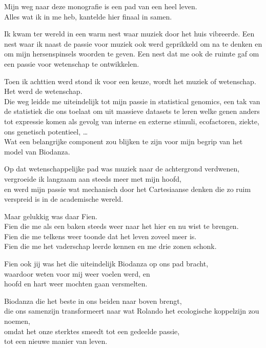\documentclass[
  11pt,
]{book}
\begin{document}
Mijn weg naar deze monografie is een pad van een heel leven.\\
Alles wat ik in me heb, kantelde hier finaal in samen.

Ik kwam ter wereld in een warm nest waar muziek door het huis vibreerde.
Een nest waar ik naast de passie voor muziek ook werd geprikkeld om na te denken en om mijn hersenspinsels woorden te geven.
Een nest dat me ook de ruimte gaf om een passie voor wetenschap te ontwikkelen.

Toen ik achttien werd stond ik voor een keuze, wordt het muziek of wetenschap.\\
Het werd de wetenschap.\\
Die weg leidde me uiteindelijk tot mijn passie in statistical genomics, een tak van de statistiek die ons toelaat om uit massieve datasets te leren welke genen anders tot expressie komen als gevolg van interne en externe stimuli, ecofactoren, ziekte, ons genetisch potentieel, \ldots{}\\
Wat een belangrijke component zou blijken te zijn voor mijn begrip van het model van Biodanza.

Op dat wetenschappelijke pad was muziek naar de achtergrond verdwenen,\\
vergroeide ik langzaam aan steeds meer met mijn hoofd,\\
en werd mijn passie wat mechanisch door het Cartesiaanse denken die zo ruim verspreid is in de academische wereld.

Maar gelukkig was daar Fien.\\
Fien die me als een baken steeds weer naar het hier en nu wist te brengen.\\
Fien die me telkens weer toonde dat het leven zoveel meer is.\\
Fien die me het vaderschap leerde kennen en me drie zonen schonk.

Fien ook jij was het die uiteindelijk Biodanza op ons pad bracht,\\
waardoor weten voor mij weer voelen werd, en\\
hoofd en hart weer mochten gaan versmelten.

Biodanza die het beste in ons beiden naar boven brengt,\\
die ons samenzijn transformeert naar wat Rolando
het ecologische koppelzijn zou noemen,\\
omdat het onze sterktes smeedt tot een gedeelde passie,\\
tot een nieuwe manier van leven.
\end{document}
